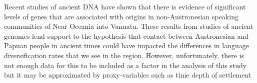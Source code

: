 \documentclass[a4paper,10pt]{article} %
\begin{document}

Recent studies of ancient DNA \citep{lipson_harvad_ancient_dna_vanuatu_2018, posth_jena_ancient_dna_vanuatu_2018} have shown that there is evidence of significant levels of genes that are associated with origins in non-Austronesian speaking communities of Near Oceania into Vanuatu. These results from studies of ancient genomes lend support to the hypothesis that contact between Austronesian and Papuan people in ancient times could have impacted the differences in language diversification rates that we see in the region. However, unfortunately, there is not enough data for this to be included as a factor in the analysis of this study but it may be approximated by proxy-variables such as time depth of settlement



\end{document}
